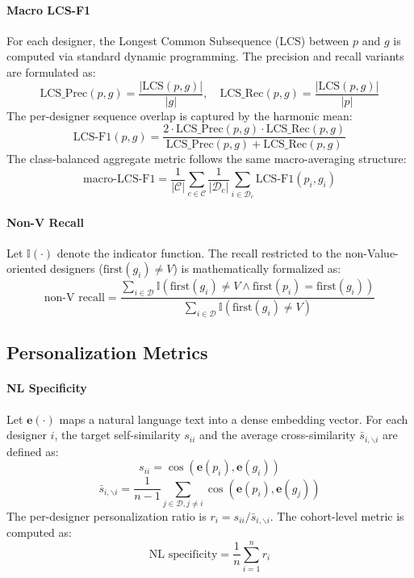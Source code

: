 \documentclass[11pt]{article}
\begin{document}
\paragraph{Macro LCS-F1}
For each designer, the Longest Common Subsequence (LCS) between $p$ and $g$ is computed via standard dynamic programming. The precision and recall variants are formulated as:
\begin{equation}
\text{LCS\_Prec}(p, g) = \frac{|\text{LCS}(p, g)|}{|g|}, \quad \text{LCS\_Rec}(p, g) = \frac{|\text{LCS}(p, g)|}{|p|}
\end{equation}
The per-designer sequence overlap is captured by the harmonic mean:
\begin{equation}
\text{LCS-F1}(p, g) = \frac{2 \cdot \text{LCS\_Prec}(p, g) \cdot \text{LCS\_Rec}(p, g)}{\text{LCS\_Prec}(p, g) + \text{LCS\_Rec}(p, g)}
\end{equation}
The class-balanced aggregate metric follows the same macro-averaging structure:
\begin{equation}
\text{macro-LCS-F1} = \frac{1}{|\mathcal{C}|} \sum_{c \in \mathcal{C}} \frac{1}{|\mathcal{D}_c|} \sum_{i \in \mathcal{D}_c} \text{LCS-F1}(p_i, g_i)
\end{equation}

\paragraph{Non-V Recall}
Let $\mathbb{I}(\cdot)$ denote the indicator function. The recall restricted to the non-Value-oriented designers ($\text{first}(g_i) \neq V$) is mathematically formalized as:
\begin{equation}
\text{non-V recall} = \frac{\sum_{i \in \mathcal{D}} \mathbb{I}(\text{first}(g_i) \neq V \land \text{first}(p_i) = \text{first}(g_i))}{\sum_{i \in \mathcal{D}} \mathbb{I}(\text{first}(g_i) \neq V)}
\end{equation}

\subsection{Personalization Metrics}

\paragraph{NL Specificity}
Let $\mathbf{e}(\cdot)$ maps a natural language text into a dense embedding vector. For each designer $i$, the target self-similarity $s_{ii}$ and the average cross-similarity $\bar{s}_{i,\backslash i}$ are defined as:
\begin{equation}
s_{ii} = \cos(\mathbf{e}(p_i), \mathbf{e}(g_i))
\end{equation}
\begin{equation}
\bar{s}_{i,\backslash i} = \frac{1}{n-1} \sum_{j \in \mathcal{D}, j \neq i} \cos(\mathbf{e}(p_i), \mathbf{e}(g_j))
\end{equation}
The per-designer personalization ratio is $r_i = s_{ii} / \bar{s}_{i,\backslash i}$. The cohort-level metric is computed as:
\begin{equation}
\text{NL specificity} = \frac{1}{n} \sum_{i=1}^{n} r_i
\end{equation}
\end{document}
